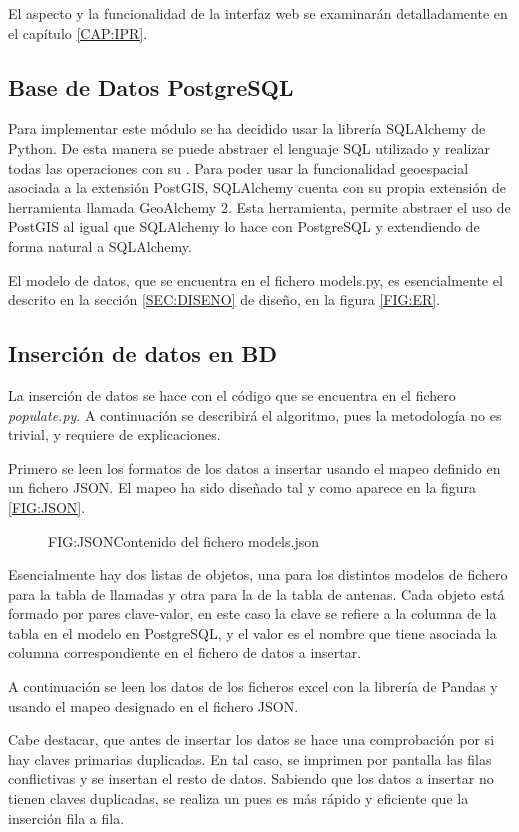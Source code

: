       El aspecto y la funcionalidad de la interfaz web se examinarán detalladamente en el capítulo \ref{CAP:IPR}.
      
      
    \subsection{Base de Datos PostgreSQL}
      Para implementar este módulo se ha decidido usar la librería SQLAlchemy\cite{sqlalchemy} de Python. De esta manera se puede abstraer el lenguaje SQL utilizado y realizar todas las operaciones con su . 
      Para poder usar la funcionalidad geoespacial asociada a la extensión PostGIS, SQLAlchemy cuenta con su propia extensión de herramienta llamada GeoAlchemy 2\cite{geoalchemy}. Esta herramienta, permite abstraer el uso de PostGIS al igual que SQLAlchemy lo hace con PostgreSQL y extendiendo de forma natural a SQLAlchemy.
      
      El modelo de datos, que se encuentra en el fichero models.py, es esencialmente el descrito en la sección \ref{SEC:DISENO} de diseño, en la figura \ref{FIG:ER}.
    
    
    \subsection{Inserción de datos en BD\label{SS:IDAT}}
      La inserción de datos se hace con el código que se encuentra en el fichero \textit{populate.py}. A continuación se describirá el algoritmo, pues la metodología no es trivial, y requiere de explicaciones.
      
      Primero se leen los formatos de los datos a insertar usando el mapeo definido en un fichero JSON.
      El mapeo ha sido diseñado tal y como aparece en la figura \ref{FIG:JSON}. 
      
      \begin{figure}[Contenido del fichero models.json]{FIG:JSON}{Contenido del fichero models.json}
      \end{figure}
      
      Esencialmente hay dos listas de objetos, una para los distintos modelos de fichero para la tabla de llamadas y otra para la de la tabla de antenas.
      Cada objeto está formado por pares clave-valor, en este caso la clave se refiere a la columna de la tabla en el modelo en PostgreSQL, y el valor es el nombre que tiene asociada la columna correspondiente en el fichero de datos a insertar.
    
      A continuación se leen los datos de los ficheros excel con la librería de Pandas\cite{pandas} y usando el mapeo designado en el fichero JSON.

      Cabe destacar, que antes de insertar los datos se hace una comprobación por si hay claves primarias duplicadas. En tal caso, se imprimen por pantalla las filas conflictivas y se insertan el resto de datos.
      Sabiendo que los datos a insertar no tienen claves duplicadas, se realiza un  pues es más rápido y eficiente que la inserción fila a fila.
